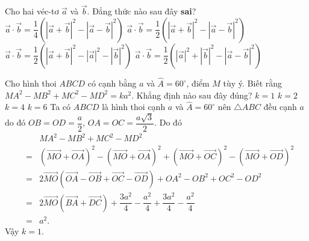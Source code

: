 \begin{ex}%
	Cho hai véc-tơ $\overrightarrow{a}$ và $\overrightarrow{b}$. Đẳng thức nào sau đây \textbf{sai}?
	\choice
	{$\overrightarrow{a}\cdot\overrightarrow{b}=\dfrac{1}{4}\left(\left|\overrightarrow{a}+\overrightarrow{b}\right|^2-\left|\overrightarrow{a}-\overrightarrow{b}\right|^2\right)$}
	{\True $\overrightarrow{a}\cdot\overrightarrow{b}=\dfrac{1}{2}\left(\left|\overrightarrow{a}+\overrightarrow{b}\right|^2-\left|\overrightarrow{a}-\overrightarrow{b}\right|^2\right)$}
	{$\overrightarrow{a}\cdot\overrightarrow{b}=\dfrac{1}{2}\left(\left|\overrightarrow{a}+\overrightarrow{b}\right|^2-\left|\overrightarrow{a}\right|^2-\left|\overrightarrow{b}\right|^2\right)$}
	{$\overrightarrow{a}\cdot\overrightarrow{b}=\dfrac{1}{2}\left(\left|\overrightarrow{a}\right|^2+\left|\overrightarrow{b}\right|^2-\left|\overrightarrow{a}-\overrightarrow{b}\right|^2\right)$}
\end{ex}

\begin{ex}%
	Cho hình thoi $ABCD$ có cạnh bằng $a$ và $\widehat{A}=60^\circ$, điểm $M$ tùy ý. Biết rằng
	$MA^2-MB^2+MC^2-MD^2=ka^2$. Khẳng định nào sau đây đúng?
	\choice
	{\True $k=1$}
	{$k=2$}
	{$k=4$}
	{$k=6$}
	\loigiai
	{
		Ta có $ABCD$ là hình thoi cạnh $a$ và $\widehat{A}=60^\circ$ nên $\triangle ABC$ đều cạnh $a$ do đó $OB=OD=\dfrac{a}{2}$, $OA=OC=\dfrac{a\sqrt{3}}{2}$. Do đó
		\begin{eqnarray*}
			&& MA^2-MB^2+MC^2-MD^2\\
			& = & \left(\overrightarrow{MO}+\overrightarrow{OA}\right)^2-\left(\overrightarrow{MO}+\overrightarrow{OA}\right)^2+\left(\overrightarrow{MO}+\overrightarrow{OC}\right)^2-\left(\overrightarrow{MO}+\overrightarrow{OD}\right)^2\\
			& = & 2\overrightarrow{MO}\left(\overrightarrow{OA}-\overrightarrow{OB}+\overrightarrow{OC}-\overrightarrow{OD}\right)+OA^2-OB^2+OC^2-OD^2\\
			& = & 2\overrightarrow{MO}\left(\overrightarrow{BA}+\overrightarrow{DC}\right)+\dfrac{3a^2}{4}-\dfrac{a^2}{4}+\dfrac{3a^2}{4}-\dfrac{a^2}{4}\\
			& = & a^2.
		\end{eqnarray*}
		Vậy $k=1$.
	}
\end{ex}

